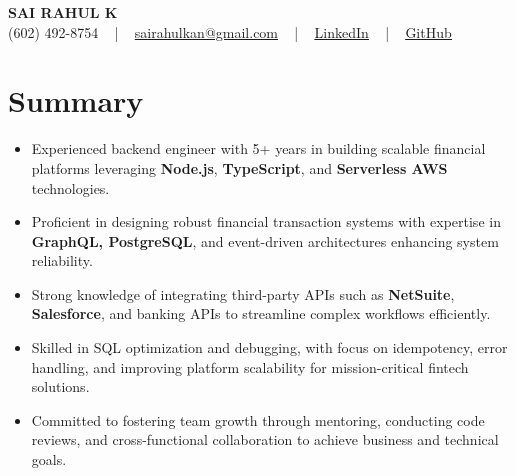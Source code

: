 \documentclass[letterpaper,11pt]{article}
\newcommand{\resumeItem}[1]{
  \item\footnotesize{
    {#1 \vspace{-2pt}}
  }
}
\newcommand{\resumeItemListStart}{\begin{itemize}[leftmargin=*]}
\newcommand{\resumeItemListEnd}{\end{itemize}\vspace{-5pt}}
\begin{document}
\begin{center}
    {\fontsize{14pt}{12pt}\selectfont \textbf{\MakeUppercase{Sai Rahul K}}}\\ \vspace{2pt}
    \fontsize{10pt}{12pt}\selectfont (602) 492-8754 ~ | ~ \href{mailto:sairahulkan@gmail.com}{sairahulkan@gmail.com} ~ | ~
    \href{https://www.linkedin.com/in/rq123/}{\color{blue}\underline{LinkedIn}} ~ | ~
    \href{https://github.com/kanrahuldo}{\color{blue}\underline{GitHub}}~
    \vspace{-8pt}
\end{center}

\section{Summary}
\fontsize{9pt}{10pt}\selectfont
\resumeItemListStart
    \resumeItem{Experienced backend engineer with 5+ years in building scalable financial platforms leveraging \textbf{Node.js}, \textbf{TypeScript}, and \textbf{Serverless AWS} technologies.}
    \resumeItem{Proficient in designing robust financial transaction systems with expertise in \textbf{GraphQL, PostgreSQL}, and event-driven architectures enhancing system reliability.}
    \resumeItem{Strong knowledge of integrating third-party APIs such as \textbf{NetSuite}, \textbf{Salesforce}, and banking APIs to streamline complex workflows efficiently.}
    \resumeItem{Skilled in SQL optimization and debugging, with focus on idempotency, error handling, and improving platform scalability for mission-critical fintech solutions.}
    \resumeItem{Committed to fostering team growth through mentoring, conducting code reviews, and cross-functional collaboration to achieve business and technical goals.}
\resumeItemListEnd
\vspace{-6pt}
\end{document}
